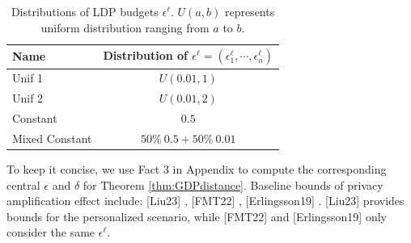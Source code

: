 \documentclass[letterpaper]{article} %
\begin{document}
\begin{table}[htbp]
  \centering
  \caption{Distributions of LDP budgets $\epsilon^\ell$. $U(a,b)$ represents uniform distribution ranging from $a$ to $b$.
      }
      \setlength{\tabcolsep}{3pt} %
    \begin{tabular}{lc}
    \toprule
    Name  & Distribution of $\epsilon^\ell = (\epsilon_1^\ell,\cdots, \epsilon_n^\ell)$  \\
  \midrule
    Unif 1 & $U(0.01,1)$  \\

    Unif 2 & $U(0.01,2)$ \\
    Constant& $0.5$  \\
     Mixed Constant & $50\%~ 0.5+50\% ~0.01$  \\

    \bottomrule
    \end{tabular}%
    \label{tab:LDPbudgets}
\end{table}%

To keep it concise, we use Fact 3 in Appendix to compute the corresponding central $\epsilon$ and $\delta$ for Theorem \ref{thm:GDPdistance}.
Baseline bounds of privacy amplification effect include: [Liu23] \cite{Liu2023}, [FMT22] \cite{Feldman2022hiding}, [Erlingsson19] \cite{Erlingsson2019amplification}.
[Liu23] provides bounds for the personalized scenario, while [FMT22] and [Erlingsson19] only consider the same $\epsilon^\ell$.
\end{document}

